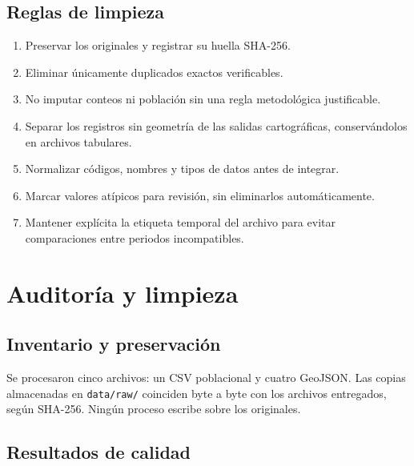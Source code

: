 \documentclass[11pt,letterpaper,oneside]{report}
\begin{document}
\section{Reglas de limpieza}

\begin{enumerate}
  \item Preservar los originales y registrar su huella SHA-256.
  \item Eliminar únicamente duplicados exactos verificables.
  \item No imputar conteos ni población sin una regla metodológica justificable.
  \item Separar los registros sin geometría de las salidas cartográficas, conservándolos en archivos tabulares.
  \item Normalizar códigos, nombres y tipos de datos antes de integrar.
  \item Marcar valores atípicos para revisión, sin eliminarlos automáticamente.
  \item Mantener explícita la etiqueta temporal del archivo para evitar comparaciones entre periodos incompatibles.
\end{enumerate}

\chapter{Auditoría y limpieza}\label{chap:auditoria}

\section{Inventario y preservación}

Se procesaron cinco archivos: un CSV poblacional y cuatro GeoJSON. Las copias almacenadas en \texttt{data/raw/} coinciden byte a byte con los archivos entregados, según SHA-256. Ningún proceso escribe sobre los originales.

\section{Resultados de calidad}
\end{document}
